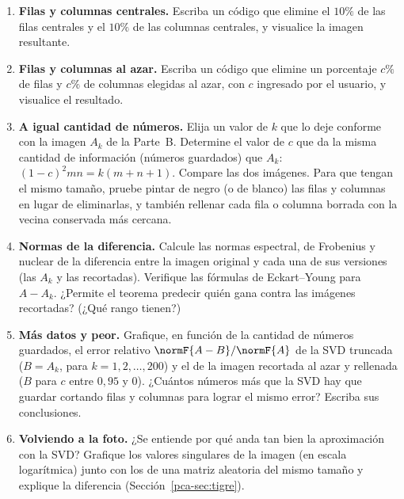 \begin{enumerate}[leftmargin=*,label=\textbf{TP.\arabic*},ref=TP.\arabic*,itemsep=6pt,resume]

\item \textbf{Filas y columnas centrales.} Escriba un código que elimine el
$10\%$ de las filas centrales y el $10\%$ de las columnas centrales, y
visualice la imagen resultante.

\item \textbf{Filas y columnas al azar.} Escriba un código que elimine un
porcentaje $c\%$ de filas y $c\%$ de columnas elegidas al azar, con $c$
ingresado por el usuario, y visualice el resultado.

\item \textbf{A igual cantidad de números.} Elija un valor de $k$ que lo deje
conforme con la imagen $A_k$ de la Parte~B. Determine el valor de $c$ que da
la misma cantidad de información (números guardados) que $A_k$:
$(1-c)^2mn=k(m+n+1)$. Compare las dos imágenes. Para que tengan el mismo
tamaño, pruebe pintar de negro (o de blanco) las filas y columnas en lugar de
eliminarlas, y también rellenar cada fila o columna borrada con la vecina
conservada más cercana.

\item \textbf{Normas de la diferencia.} Calcule las normas espectral, de
Frobenius y nuclear de la diferencia entre la imagen original y cada una de
sus versiones (las $A_k$ y las recortadas). Verifique las fórmulas de
Eckart--Young para $A-A_k$. ¿Permite el teorema predecir quién gana contra las
imágenes recortadas? (¿Qué rango tienen?)

\item \textbf{Más datos y peor.} Grafique, en función de la cantidad de
números guardados, el error relativo $\normF{A-B}/\normF{A}$ de la SVD
truncada ($B=A_k$, para $k=1,2,\dots,200$) y el de la imagen recortada al azar
y rellenada ($B$ para $c$ entre $0{,}95$ y $0$). ¿Cuántos números más que la
SVD hay que guardar cortando filas y columnas para lograr el mismo error?
Escriba sus conclusiones.

\item \textbf{Volviendo a la foto.} ¿Se entiende por qué anda tan bien la
aproximación con la SVD? Grafique los valores singulares de la imagen (en
escala logarítmica) junto con los de una matriz aleatoria del mismo tamaño y
explique la diferencia (Sección~\ref{pca-sec:tigre}).

\end{enumerate}

